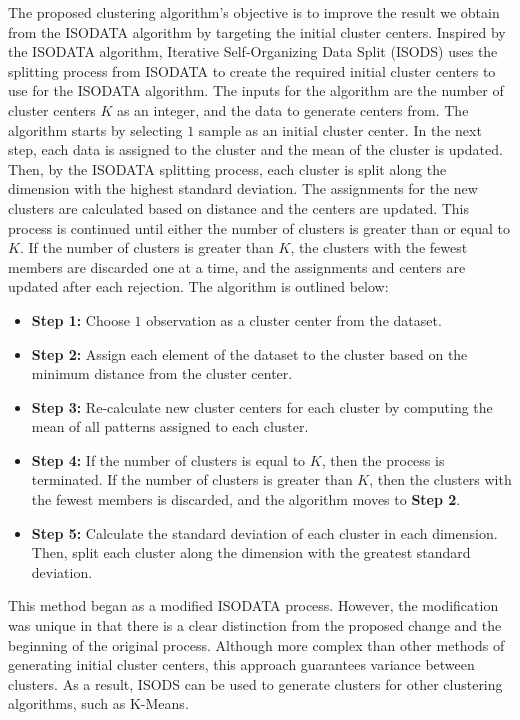 \documentclass[twoside,twocolumn]{article}
\begin{document}
The proposed clustering algorithm's objective is to improve the result we obtain
from the ISODATA algorithm by targeting the initial cluster centers. Inspired by
the ISODATA algorithm, Iterative Self-Organizing Data Split (ISODS) uses the
splitting process from ISODATA to create the required initial cluster centers to
use for the ISODATA algorithm. The inputs for the algorithm are the number of
cluster centers $K$ as an integer, and the data to generate centers from. The
algorithm starts by selecting $1$ sample as an initial cluster center. In the
next step, each data is assigned to the cluster and the mean of the cluster is
updated. Then, by the ISODATA splitting process, each cluster is split along the
dimension with the highest standard deviation. The assignments for the new
clusters are calculated based on distance and the centers are updated. This
process is continued until either the number of clusters is greater than or
equal to $K$. If the number of clusters is greater than $K$, the clusters with
the fewest members are discarded one at a time, and the assignments and centers
are updated after each rejection. The algorithm is outlined below:

\begin{itemize}
  \item \textbf{Step 1:} Choose $1$ observation as a cluster center from the dataset.
  \item \textbf{Step 2:} Assign each element of the dataset to the cluster based
        on the minimum distance from the cluster center.
  \item \textbf{Step 3:} Re-calculate new cluster centers for each cluster by
        computing the mean of all patterns assigned to each cluster.
  \item \textbf{Step 4:} If the number of clusters is equal to $K$, then the
        process is terminated. If the number of clusters is greater than $K$, then the
        clusters with the fewest members is discarded, and the algorithm moves to
        \textbf{Step 2}.
  \item \textbf{Step 5:} Calculate the standard deviation of each cluster in each
        dimension. Then, split each cluster along the dimension with the greatest
        standard deviation.
\end{itemize}

This method began as a modified ISODATA process. However, the modification was
unique in that there is a clear distinction from the proposed change and the
beginning of the original process. Although more complex than other methods of
generating initial cluster centers, this approach guarantees variance between
clusters. As a result, ISODS can be used to generate clusters for other
clustering algorithms, such as K-Means.
\end{document}
